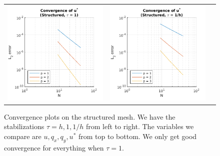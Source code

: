 \documentclass{article}
\begin{document}
\begin{figure}
\begin{tabular}{c c c}
\includegraphics[scale=0.5]{cspp_2.png} & 
\includegraphics[scale=0.5]{cspp_3.png}
\end{tabular}
\label{fig:cs}
\caption{Convergence plots on the structured mesh. We have the stabilizations $\tau = h, 1, 1/h$ from left to right. The variables we compare are $u, q_x, q_y, u^*$ from top to bottom. We only get good convergence for everything when $\tau = 1$.}
\end{figure}
\end{document}
